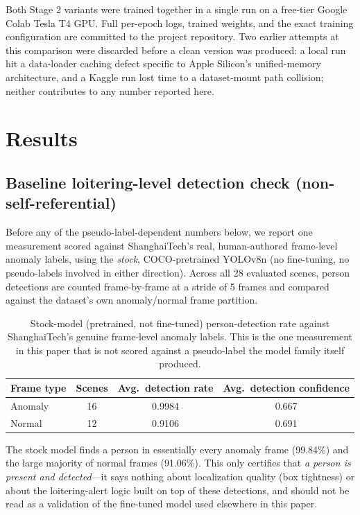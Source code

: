 \documentclass[11pt]{article}
\begin{document}
Both Stage 2 variants were trained together in a single run on a free-tier
Google Colab Tesla T4 GPU. Full per-epoch logs, trained weights, and the
exact training configuration are committed to the project repository. Two
earlier attempts at this comparison were discarded before a clean version was
produced: a local run hit a data-loader caching defect specific to Apple
Silicon's unified-memory architecture, and a Kaggle run lost time to a
dataset-mount path collision; neither contributes to any number reported
here.

\section{Results}
\label{sec:results}

\subsection{Baseline loitering-level detection check (non-self-referential)}
\label{sec:baseline-check}

Before any of the pseudo-label-dependent numbers below, we report one
measurement scored against ShanghaiTech's real, human-authored frame-level
anomaly labels, using the \emph{stock}, COCO-pretrained YOLOv8n (no
fine-tuning, no pseudo-labels involved in either direction). Across all 28
evaluated scenes, person detections are counted frame-by-frame at a stride of
5 frames and compared against the dataset's own anomaly/normal frame
partition.

\begin{table}[h]
\centering
\begin{tabular}{lccc}
\toprule
Frame type & Scenes & Avg.\ detection rate & Avg.\ detection confidence \\
\midrule
Anomaly    & 16 & 0.9984 & 0.667 \\
Normal     & 12 & 0.9106 & 0.691 \\
\bottomrule
\end{tabular}
\caption{Stock-model (pretrained, not fine-tuned) person-detection rate
against ShanghaiTech's genuine frame-level anomaly labels. This is the one
measurement in this paper that is not scored against a pseudo-label the
model family itself produced.}
\label{tab:baseline-check}
\end{table}

The stock model finds a person in essentially every anomaly frame (99.84\%)
and the large majority of normal frames (91.06\%). This only certifies that
\emph{a person is present and detected}---it says nothing about localization
quality (box tightness) or about the loitering-alert logic built on top of
these detections, and should not be read as a validation of the fine-tuned
model used elsewhere in this paper.
\end{document}
